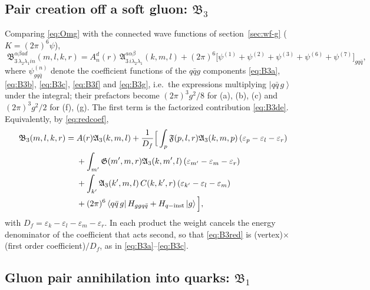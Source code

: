 \documentclass[11pt,a4paper]{article}
\numberwithin{equation}{section}
\newcommand{\mf}[1]{\mathfrak{#1}}
\newcommand{\eps}{\varepsilon}
\newcommand{\ket}[1]{\left|#1\right\rangle}
\newcommand{\bra}[1]{\left\langle#1\right|}
\begin{document}
\subsection{Pair creation off a soft gluon: $\mf B_{3}$}

Comparing \eqref{eq:Omg} with the connected wave functions of section~\ref{sec:wf-g}
($K=(2\pi)^{6}\psi$),
\begin{equation}
\boxed{\;
\mf B^{\alpha\beta ad}_{3\,\lambda_{2}\lambda_{1}in}(m,l,k,r)=A^{d}_{n}(r)\,\mf A^{a\alpha\beta}_{3\,i\lambda_{2}\lambda_{1}}(k,m,l)
+(2\pi)^{6}\Big[\psi^{(1)}+\psi^{(2)}+\psi^{(3)}+\psi^{(6)}+\psi^{(7)}\Big]_{gq\bar q},\;}
\label{eq:B3}
\end{equation}
where $\psi^{(n)}_{gq\bar q}$ denote the coefficient functions of the $q\bar q g$ components
\eqref{eq:B3a}, \eqref{eq:B3b}, \eqref{eq:B3c}, \eqref{eq:B3f} and \eqref{eq:B3g}, i.e.\ the expressions
multiplying $\ket{q\bar q\,g}$ under the integral; their prefactors become $(2\pi)^{3}g^{2}/8$ for
(a), (b), (c) and $(2\pi)^{3}g^{2}/2$ for (f), (g). The first term is the factorized contribution
\eqref{eq:B3de}. Equivalently, by \eqref{eq:redcoef},
\begin{align}
\mf B_{3}(m,l,k,r)=\;&A(r)\mf A_{3}(k,m,l)+\frac{1}{D_{f}}\Big[\int_{p}\mf F(p,l,r)\mf A_{3}(k,m,p)\,(\eps_{p}-\eps_{l}-\eps_{r})
\nonumber\\
&+\int_{m'}\mf G(m',m,r)\mf A_{3}(k,m',l)\,(\eps_{m'}-\eps_{m}-\eps_{r})
\nonumber\\
&+\int_{k'}\mf A_{3}(k',m,l)\,C(k,k',r)\,(\eps_{k'}-\eps_{l}-\eps_{m})
\nonumber\\
&+(2\pi)^{6}\bra{q\bar q\,g}H_{ggq\bar q}+H_{q-{\rm inst}}\ket{g}\Big],
\label{eq:B3red}
\end{align}
with $D_{f}=\eps_{k}-\eps_{l}-\eps_{m}-\eps_{r}$. In each product the weight cancels the energy
denominator of the coefficient that acts second, so that \eqref{eq:B3red} is (vertex)$\times$(first
order coefficient)$/D_{f}$, as in \eqref{eq:B3a}--\eqref{eq:B3c}.

\subsection{Gluon pair annihilation into quarks: $\mf B_{1}$}
\end{document}
